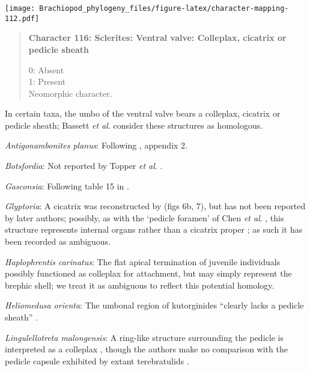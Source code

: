 \documentclass[openany]{book}
\theoremstyle{definition}
\theoremstyle{definition}
\theoremstyle{definition}
\theoremstyle{remark}
\begin{document}
\texttt{[image: Brachiopod\_phylogeny\_files/figure-latex/character-mapping-112.pdf]}

\begin{quote}
\textbf{Character 116: Sclerites: Ventral valve: Colleplax, cicatrix or
pedicle sheath}

0: Absent\\
1: Present\\
Neomorphic character.
\end{quote}

In certain taxa, the umbo of the ventral valve bears a colleplax,
cicatrix or pedicle sheath; Bassett \emph{et al}.
\citeyearpar{Bassett2008Earlyontogeny} consider these structures as
homologous.

\hypertarget{Antigonambonites_planus-coding-116}{}
\emph{Antigonambonites planus}: Following
\citet{Williams1998Thediversity}, appendix 2.

\hypertarget{Botsfordia-coding-116}{}
\emph{Botsfordia}: Not reported by Topper \emph{et al}.
\citeyearpar{Topper2013Reappraisalof}.

\hypertarget{Gasconsia-coding-116}{}
\emph{Gasconsia}: Following table 15 in
\citet{Williams2000LinguliformeaCraniiformea}.

\hypertarget{Glyptoria-coding-116}{}
\emph{Glyptoria}: A cicatrix was reconstructed by
\citet{Jin1992Revisionof} (figs 6b, 7), but has not been reported by
later authors; possibly, as with the `pedicle foramen' of Chen \emph{et
al}. \citeyearpar{Chen2007Reinterpretationof}, this structure represents
internal organs rather than a cicatrix proper
\citep{Zhang2009Architectureand}; as such it has been recorded as
ambiguous.

\hypertarget{Haplophrentis_carinatus-coding-116}{}
\emph{Haplophrentis carinatus}: The flat apical termination of juvenile
individuals possibly functioned as colleplax for attachment, but may
simply represent the brephic shell; we treat it as ambiguous to reflect
this potential homology.

\hypertarget{Heliomedusa_orienta-coding-116}{}
\emph{Heliomedusa orienta}: The umbonal region of kutorginides ``clearly
lacks a pedicle sheath'' \citep{Holmer2018Theattachment}.

\hypertarget{Lingulellotreta_malongensis-coding-116}{}
\emph{Lingulellotreta malongensis}: A ring-like structure surrounding
the pedicle is interpreted as a colleplax
\citep{Zhang2011Theexceptionally}, though the authors make no comparison
with the pedicle capsule exhibited by extant terebratulids
\citep[see][]{Holmer2018Evolutionarysignificance}.
\end{document}
